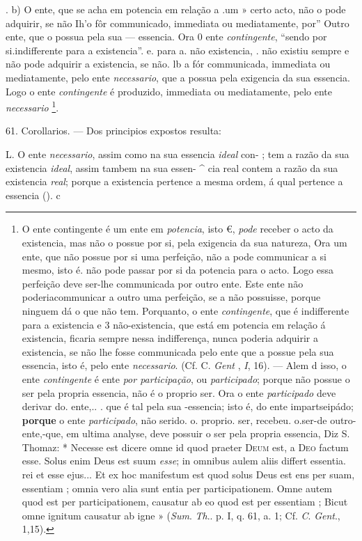. b) O ente, que se acha em potencia em relação a .um » certo acto, não o pode adquirir, se não Ih'o fôr communicado, immediata ou mediatamente, por” Outro ente, que o possua pela sua --- essencia. Ora 0 ente \emph{contingente}, “sendo por si.indifferente para a existencia”. e. para a. não existencia, . não existiu sempre e não pode adquirir a existencia, se não. lb a fór communicada, immediata ou mediatamente, pelo ente \emph{necessario}, que a possua pela exigencia da sua essencia. Logo o ente \emph{contingente} é produzido, immediata ou mediatamente, pelo ente \emph{necessario} \footnote{O ente contingente é um ente em \emph{potencia}, isto €, \emph{pode} receber o acto da existencia, mas não o possue por si, pela exigencia da sua natureza, Ora um ente, que não possue por si uma perfeição, não a pode communicar a si mesmo, isto é. não pode passar por si da potencia para o acto. Logo essa perfeição deve ser-lhe communicada por outro ente. Este ente não poderiacommunicar a outro uma perfeição, se a não possuisse, porque ninguem dá o que não tem. Porquanto, o ente \emph{contingente}, que é indifferente para a existencia e 3 não-existencia, que está em potencia em relação á existencia, ficaria sempre nessa indifferença, nunca poderia adquirir a existencia, se não lhe fosse communicada pelo ente que a possue pela sua essencia, isto é, pelo ente \emph{necessario}. (Cf. C. \emph{Gent} , \emph{I}, 16). --- Alem d isso, o ente \emph{contingente} é ente \emph{por participação}, ou \emph{participado}; porque não possue o ser pela propria essencia, não é o proprio ser. Ora o ente \emph{participado} deve derivar do. ente,.. . que é tal pela sua -essencia; isto é, do ente impartseipádo; \textbf{porque} o ente \emph{participado}, não serido. o. proprio. ser, recebeu. o.ser-de outro- ente,-que, em ultima analyse, deve possuir o ser pela propria essencia, Diz S. Thomaz: * Necesse est dicere omne id quod praeter \textsc{Deum} est, a \textsc{Deo} factum esse. Solus enim Deus est suum \emph{esse}; in omnibus aulem aliis differt essentia. rei et esse ejus... Et ex hoc manifestum est quod solus Deus est ens per suam, essentiam ; omnia vero alia sunt entia per participationem. Omne autem quod est per participationem, causatur ab eo quod est per essentiam ; Bicut omne ignitum causatur ab igne » (\emph{Sum}. \emph{Th}.. p. I, q. 61, a. 1; Cf. \emph{C}. \emph{Gent}., 1,15).}.

 61. Corollarios. --- Dos principios expostos resulta:

L. O ente \emph{necessario}, assim como na sua essencia \emph{ideal} con- ; tem a razão da sua existencia \emph{ideal}, assim tambem na sua essen- \textasciicircum{} cia real contem a razão da sua existencia \emph{real}; porque a existencia pertence a mesma ordem, á qual pertence a essencia (). c

